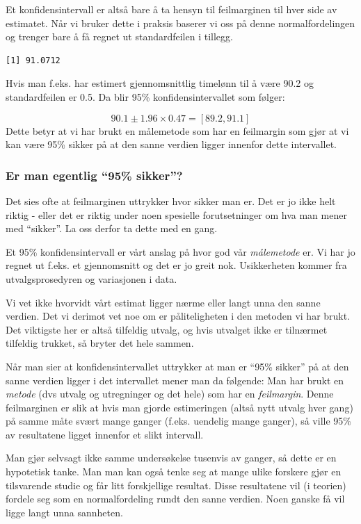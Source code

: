 \documentclass[
  norsk,
  letterpaper,
  DIV=11,
  numbers=noendperiod]{scrreprt}
\theoremstyle{definition}
\theoremstyle{remark}
\begin{document}
Et konfidensintervall er altså bare å ta hensyn til feilmarginen til
hver side av estimatet. Når vi bruker dette i praksis baserer vi oss på
denne normalfordelingen og trenger bare å få regnet ut standardfeilen i
tillegg.

\begin{verbatim}
[1] 91.0712
\end{verbatim}

Hvis man f.eks. har estimert gjennomsnittlig timelønn til å være 90.2 og
standardfeilen er 0.5. Da blir 95\% konfidensintervallet som følger:

\[ 90.1 \pm 1.96 \times 0.47 = [89.2, 91.1]\] Dette betyr at vi har
brukt en målemetode som har en feilmargin som gjør at vi kan være 95\%
sikker på at den sanne verdien ligger innenfor dette intervallet.

\subsubsection{Er man egentlig ``95\%
sikker''?}\label{er-man-egentlig-95-sikker}

Det sies ofte at feilmarginen uttrykker hvor sikker man er. Det er jo
ikke helt riktig - eller det er riktig under noen spesielle
forutsetninger om hva man mener med ``sikker''. La oss derfor ta dette
med en gang.

Et 95\% konfidensintervall er vårt anslag på hvor god vår
\emph{målemetode} er. Vi har jo regnet ut f.eks. et gjennomsnitt og det
er jo greit nok. Usikkerheten kommer fra utvalgsprosedyren og
variasjonen i data.

Vi vet ikke hvorvidt vårt estimat ligger nærme eller langt unna den
sanne verdien. Det vi derimot vet noe om er påliteligheten i den metoden
vi har brukt. Det viktigste her er altså tilfeldig utvalg, og hvis
utvalget ikke er tilnærmet tilfeldig trukket, så bryter det hele sammen.

Når man sier at konfidensintervallet uttrykker at man er ``95\% sikker''
på at den sanne verdien ligger i det intervallet mener man da følgende:
Man har brukt en \emph{metode} (dvs utvalg og utregninger og det hele)
som har en \emph{feilmargin}. Denne feilmarginen er slik at hvis man
gjorde estimeringen (altså nytt utvalg hver gang) på samme måte svært
mange ganger (f.eks. uendelig mange ganger), så ville 95\% av
resultatene ligget innenfor et slikt intervall.

Man gjør selvsagt ikke samme undersøkelse tusenvis av ganger, så dette
er en hypotetisk tanke. Man man kan også tenke seg at mange ulike
forskere gjør en tilsvarende studie og får litt forskjellige resultat.
Disse resultatene vil (i teorien) fordele seg som en normalfordeling
rundt den sanne verdien. Noen ganske få vil ligge langt unna sannheten.
\end{document}
